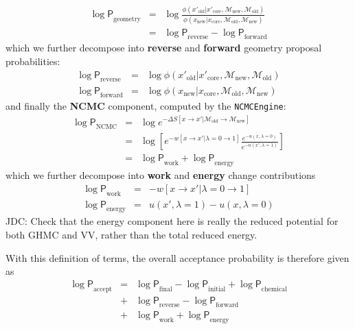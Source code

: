 \documentclass[aps,pre,twocolumn,nofootinbib,superscriptaddress,linenumbers,11point]{revtex4-1}
\newcommand{\logP}{{\log \mathsf{P}}}
\begin{document}
\begin{itemize}
\begin{eqnarray}
\logP_\mathrm{geometry} &=& \log \frac{\phi(x'_\mathrm{old} | x'_\mathrm{core}, \mathcal{M}_\mathrm{new}, \mathcal{M}_\mathrm{old})}{\phi(x_\mathrm{new} | x_\mathrm{core}, \mathcal{M}_\mathrm{old}, \mathcal{M}_\mathrm{new})} \label{equation:hybrid-geometry} \\
&=& \logP_\mathrm{reverse} - \logP_\mathrm{forward}
\end{eqnarray}
which we further decompose into {\bf reverse} and {\bf forward} geometry proposal probabilities:
\begin{eqnarray}
\logP_\mathrm{reverse} &=& \log \phi(x'_\mathrm{old} | x'_\mathrm{core}, \mathcal{M}_\mathrm{new}, \mathcal{M}_\mathrm{old}) \\
\logP_\mathrm{forward} &=& \log \phi(x_\mathrm{new} | x_\mathrm{core}, \mathcal{M}_\mathrm{old}, \mathcal{M}_\mathrm{new})
\end{eqnarray}
and finally the {\bf NCMC} component, computed by the {\tt NCMCEngine}:
\begin{eqnarray}
\logP_\mathrm{NCMC} &=& \log e^{-\Delta S[x \rightarrow x' | \mathcal{M}_\mathrm{old} \rightarrow \mathcal{M}_\mathrm{new}]}  \label{equation:hybrid-ncmc} \\
&=& \log \left[ e^{-w[x \rightarrow x' | \lambda = 0 \rightarrow 1]} \frac{e^{-u(x, \lambda=0)}}{e^{-u(x', \lambda=1)}} \right] \\
&=& \logP_\mathrm{work} + \logP_\mathrm{energy}
\end{eqnarray}
which we further decompose into {\bf work} and {\bf energy} change contributions
\begin{eqnarray}
\logP_\mathrm{work} &=& -w[x \rightarrow x' | \lambda = 0 \rightarrow 1] \\
\logP_\mathrm{energy} &=& u(x', \lambda=1) - u(x, \lambda=0)
\end{eqnarray}
{\color{red} JDC: Check that the energy component here is really the reduced potential for both GHMC and VV, rather than the total reduced energy.}
\end{itemize}
With this definition of terms, the overall acceptance probability is therefore given as
\begin{eqnarray}
\logP_\mathrm{accept} &=& \logP_\mathrm{final} - \logP_\mathrm{initial} + \logP_\mathrm{chemical} \nonumber \\
&+& \logP_\mathrm{reverse} - \logP_\mathrm{forward} \nonumber \\
&+& \logP_\mathrm{work} + \logP_\mathrm{energy}
\end{eqnarray}
\end{document}
